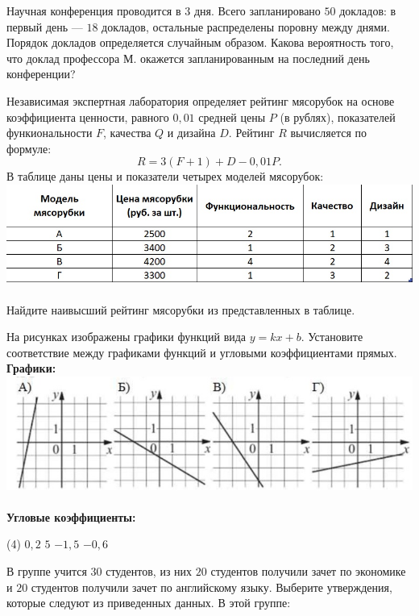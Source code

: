 \begin{class}[number=5]
\begin{listofex}
		\item Научная конференция проводится в \(3\) дня. Всего запланировано \(50\) докладов: в первый день --- \(18\) докладов, остальные распределены поровну между днями. Порядок докладов определяется случайным образом. Какова вероятность того, что доклад профессора М. окажется запланированным на последний день конференции?
		\item Независимая экспертная лаборатория определяет рейтинг мясорубок на основе коэффициента ценности, равного \(0,01\) средней цены \(P\) (в рублях), показателей функиональности \(F\), качества \(Q\) и дизайна \(D\). Рейтинг \(R\) вычисляется по формуле: \[ R=3(F+1)+D-0,01P. \] В таблице даны цены и показатели четырех моделей мясорубок:
		\\
		\includegraphics[align=t, width=\linewidth]{../pics/G101M8L5-2}
		\\
		\\ Найдите наивысший рейтинг мясорубки из представленных в таблице.
		\item На рисунках изображены графики функций вида \(y=kx+b\). Установите соответствие между графиками функций и угловыми коэффициентами прямых.
		\\ \textbf{Графики:}
		\\
		\includegraphics[align=t, width=\linewidth]{../pics/G101M8L5-3}
		\\ \\
		\textbf{Угловые коэффициенты:}
		\begin{tasks}(4)
			\task \( 0,2 \)
			\task \( 5 \)
			\task \( -1,5 \)
			\task \( -0,6 \)
		\end{tasks}
		\newpage
		\item В группе учится \(30\) студентов, из них \(20\) студентов получили зачет по экономике и \(20\) студентов получили зачет по английскому языку. Выберите утверждения, которые следуют из приведенных данных. В этой группе:

\end{listofex}
\end{class}
